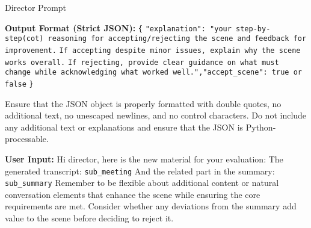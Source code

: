 \begin{figure*}[t]
\begin{AIbox}{Director Prompt}
{        \textbf{Output Format (Strict JSON):} \newline
        \texttt{\{} \newline
        \quad \texttt{"explanation": "your step-by-step(cot) reasoning for accepting/rejecting the scene and feedback for improvement.} \newline
        \quad \texttt{If accepting despite minor issues, explain why the scene works overall.} \newline
        \quad \texttt{If rejecting, provide clear guidance on what must change while acknowledging what worked well.",}\newline \quad \texttt{"accept\_scene": true or false} \texttt{\}} \newline
        
        Ensure that the JSON object is properly formatted with double quotes, no additional text, no unescaped newlines, and no control characters. Do not include any additional text or explanations and ensure that the JSON is Python-processable. \newline
        
        \textbf{User Input:} \newline
        Hi director, here is the new material for your evaluation: \newline
        The generated transcript: \texttt{{sub\_meeting}} \newline
        And the related part in the summary: \texttt{{sub\_summary}} \newline
        Remember to be flexible about additional content or natural conversation elements that enhance the scene while ensuring the core requirements are met. Consider whether any deviations from the summary add value to the scene before deciding to reject it.
    }
    \end{AIbox}
    \caption{Prompt template for evaluating movie scene alignment with intended script and narrative.}
    \label{fig:director_prompt}
\end{figure*}


